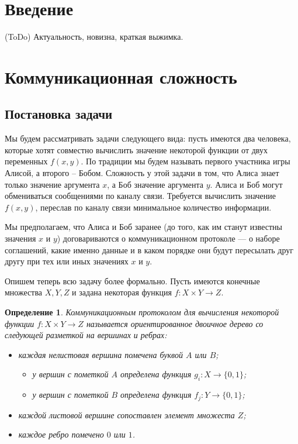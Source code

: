 \documentclass[a4paper]{article}
\newtheorem*{mdefinition}{Определение}
\begin{document}
\newpage

\tableofcontents

\newpage
 
\newpage


\setcounter{section}{0}
\section*{Введение}
(ToDo) Актуальность, новизна, краткая выжимка.

\addtocounter{section}{1}
\section*{Коммуникационная сложность}
\setcounter{subsection}{0}

\subsection{Постановка задачи}
Мы будем рассматривать задачи следующего вида: пусть имеются два человека, которые хотят совместно
вычислить значение некоторой функции от двух переменных $f(x, y)$. По традиции мы будем называть
первого участника игры Алисой, а второго -- Бобом. Сложность у этой задачи в том, что Алиса знает только
значение аргумента $x$, а Боб значение аргумента $y$. Алиса и Боб могут обмениваться сообщениями 
по каналу связи. Требуется вычислить значение $f(x, y)$, переслав по каналу связи минимальное
количество информации.

Мы предполагаем, что Алиса и Боб заранее (до того, как им станут известны значения $x$ и $y$)
договариваются о коммуникационном протоколе --- о наборе соглашений, какие именно данные и
в каком порядке они будут пересылать друг другу при тех или иных значениях $x$ и $y$.

Опишем теперь всю задачу более формально. Пусть имеются конечные множества $X, Y, Z$ и задана
некоторая функция $f:X\times Y\rightarrow Z$.

\begin{mdefinition}
    Коммуникационным протоколом для вычисления некоторой функции $f:X\times Y\rightarrow Z$ называется
    ориентированное двоичное дерево со следующей разметкой на вершинах и ребрах:
    \begin{itemize}[noitemsep]
        \item каждая нелистовая вершина помечена буквой $A$ или $B$;
        \begin{itemize}[noitemsep]
			\item у вершин с пометкой $A$ определена функция $g_i:X\rightarrow \{0,1\}$;
			\item у вершин с пометкой $B$ определена функция $f_j:Y\rightarrow \{0,1\}$;
        \end{itemize}
        \item каждой листовой вершине сопоставлен элемент множеста $Z$;
        \item каждое ребро помечено $0$ или $1$.

    \end{itemize}
\end{mdefinition}
\end{document}
